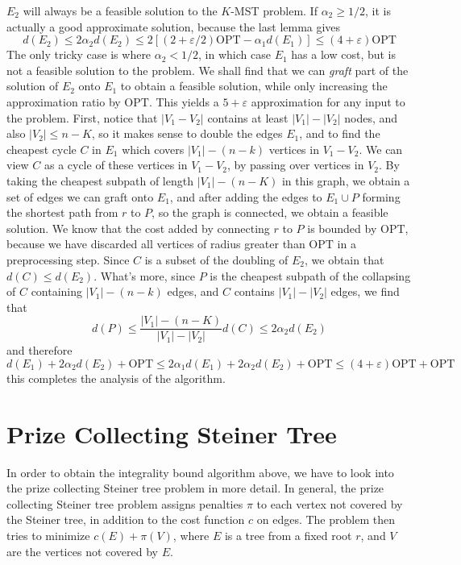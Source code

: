 \documentclass{article}
\theoremstyle{plain}
\theoremstyle{plain}
\begin{document}
$E_2$ will always be a feasible solution to the $K$-MST problem. If $\alpha_2 \geq 1/2$, it is actually a good approximate solution, because the last lemma gives
%
\[ d(E_2) \leq 2 \alpha_2 d(E_2) \leq 2[(2 + \varepsilon/2) \text{OPT} - \alpha_1 d(E_1)] \leq (4 + \varepsilon) \text{OPT} \]
%
The only tricky case is where $\alpha_2 < 1/2$, in which case $E_1$ has a low cost, but is not a feasible solution to the problem. We shall find that we can {\it graft} part of the solution of $E_2$ onto $E_1$ to obtain a feasible solution, while only increasing the approximation ratio by $\text{OPT}$. This yields a $5 + \varepsilon$ approximation for any input to the problem. First, notice that $|V_1 - V_2|$ contains at least $|V_1| - |V_2|$ nodes, and also $|V_2| \leq n-K$, so it makes sense to double the edges $E_1$, and to find the cheapest cycle $C$ in $E_1$ which covers $|V_1| - (n-k)$ vertices in $V_1 - V_2$. We can view $C$ as a cycle of these vertices in $V_1 - V_2$, by passing over vertices in $V_2$. By taking the cheapest subpath of length $|V_1| - (n-K)$ in this graph, we obtain a set of edges we can graft onto $E_1$, and after adding the edges to $E_1 \cup P$ forming the shortest path from $r$ to $P$, so the graph is connected, we obtain a feasible solution. We know that the cost added by connecting $r$ to $P$ is bounded by $\text{OPT}$, because we have discarded all vertices of radius greater than $\text{OPT}$ in a preprocessing step. Since $C$ is a subset of the doubling of $E_2$, we obtain that $d(C) \leq d(E_2)$. What's more, since $P$ is the cheapest subpath of the collapsing of $C$ containing $|V_1| - (n-k)$ edges, and $C$ contains $|V_1| - |V_2|$ edges, we find that
%
\[ d(P) \leq \frac{|V_1| - (n-K)}{|V_1| - |V_2|} d(C) \leq 2\alpha_2 d(E_2) \]
%
and therefore
%
\[ d(E_1) + 2 \alpha_2 d(E_2) + \text{OPT} \leq 2\alpha_1 d(E_1) + 2\alpha_2 d(E_2) + \text{OPT} \leq (4 + \varepsilon) \text{OPT} + \text{OPT} \]
%
this completes the analysis of the algorithm.

\section{Prize Collecting Steiner Tree}

In order to obtain the integrality bound algorithm above, we have to look into the prize collecting Steiner tree problem in more detail. In general, the prize collecting Steiner tree problem assigns penalties $\pi$ to each vertex not covered by the Steiner tree, in addition to the cost function $c$ on edges. The problem then tries to minimize $c(E) + \pi(V)$, where $E$ is a tree from a fixed root $r$, and $V$ are the vertices not covered by $E$.
\end{document}
